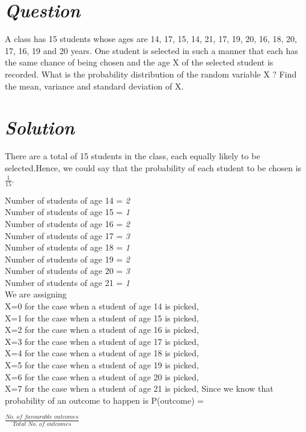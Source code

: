 \documentclass[journal,12pt,twocolumn]{IEEEtran}
\begin{document}
\section * {\emph{Question}}
A class has 15 students whose ages are 14, 17, 15, 14, 21, 17, 19, 20, 16, 18, 20, 17, 16, 19 and 20 years. One student is selected in such a manner that each has the same chance of being chosen and the age X of the selected student is recorded. What is the  probability distribution of the random variable X ? Find the  mean, variance and standard deviation of X.
\section*{\emph{Solution}}
There are a total of 15 students in the class, each equally likely to be selected.Hence, we could say that the probability of each student to be chosen is {$\frac{1}{15}$}.

   Number of students of age {14} = \emph{2}
\\ Number of students of age {15} = \emph{1}
\\ Number of students of age {16} = \emph{2}
\\ Number of students of age {17} = \emph{3}
\\ Number of students of age {18} = \emph{1}
\\ Number of students of age {19} = \emph{2}
\\ Number of students of age {20} = \emph{3}
\\ Number of students of age {21} = \emph{1}
\\We are assigning 
\\{X=0} for the case when a student of age {14} is picked,
\\{X=1} for the case when a student of age {15} is picked, 
\\{X=2} for the case when a student of age {16} is picked,
\\{X=3} for the case when a student of age {17} is picked,
\\{X=4} for the case when a student of age {18} is picked,
\\{X=5} for the case when a student of age {19} is picked,
\\{X=6} for the case when a student of age {20} is picked,
\\{X=7} for the case when a student of age {21} is picked,
Since we know that probability of an outcome to happen is P(outcome) =

    
$\frac{\textit{No. of favourable outcomes}} {\textit{Total No. of outcomes}}$
\end{document}

